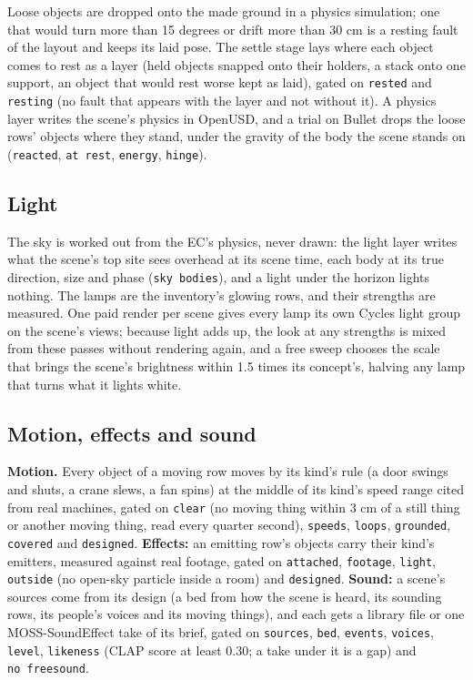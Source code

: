 Loose objects are dropped onto the made ground in a physics simulation; one that would turn more than 15 degrees or drift more than 30 cm is a resting fault of the layout and keeps its laid pose. The settle stage lays where each object comes to rest as a layer (held objects snapped onto their holders, a stack onto one support, an object that would rest worse kept as laid), gated on \texttt{rested} and \texttt{resting} (no fault that appears with the layer and not without it). A physics layer writes the scene's physics in OpenUSD, and a trial on Bullet drops the loose rows' objects where they stand, under the gravity of the body the scene stands on (\texttt{reacted}, \texttt{at\ rest}, \texttt{energy}, \texttt{hinge}).

\subsection{Light}\label{light}

The sky is worked out from the EC's physics, never drawn: the light layer writes what the scene's top site sees overhead at its scene time, each body at its true direction, size and phase (\texttt{sky\ bodies}), and a light under the horizon lights nothing. The lamps are the inventory's glowing rows, and their strengths are measured. One paid render per scene gives every lamp its own Cycles light group on the scene's views; because light adds up, the look at any strengths is mixed from these passes without rendering again, and a free sweep chooses the scale that brings the scene's brightness within 1.5 times its concept's, halving any lamp that turns what it lights white.

\subsection{Motion, effects and sound}\label{motion-effects-and-sound}

\textbf{Motion.} Every object of a moving row moves by its kind's rule (a door swings and shuts, a crane slews, a fan spins) at the middle of its kind's speed range cited from real machines, gated on \texttt{clear} (no moving thing within 3 cm of a still thing or another moving thing, read every quarter second), \texttt{speeds}, \texttt{loops}, \texttt{grounded}, \texttt{covered} and \texttt{designed}. \textbf{Effects:} an emitting row's objects carry their kind's emitters, measured against real footage, gated on \texttt{attached}, \texttt{footage}, \texttt{light}, \texttt{outside} (no open-sky particle inside a room) and \texttt{designed}. \textbf{Sound:} a scene's sources come from its design (a bed from how the scene is heard, its sounding rows, its people's voices and its moving things), and each gets a library file or one MOSS-SoundEffect \citep{moss2026} take of its brief, gated on \texttt{sources}, \texttt{bed}, \texttt{events}, \texttt{voices}, \texttt{level}, \texttt{likeness} (CLAP \citep{wu2022clap} score at least 0.30; a take under it is a gap) and \texttt{no\ freesound}.

